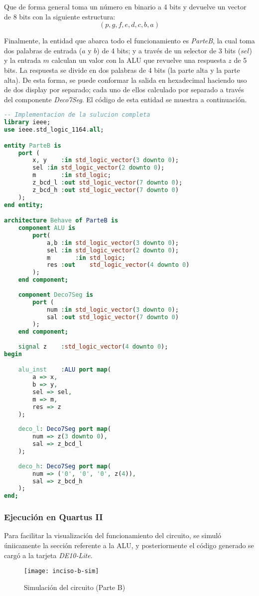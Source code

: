 \documentclass[../procedimientos.tex]{subfiles}
\begin{document}
Que de forma general toma un número en binario a 4 bits y devuelve un vector 
de 8 bits con la siguiente estructura:
\[(p, g, f, e, d, c, b, a)\]

Finalmente, la entidad que abarca todo el funcionamiento es \textit{ParteB}, 
la cual toma dos palabras de entrada ($a$ y $b$) de 4 bits; y a través de un 
selector de 3 bits ($sel$) y la entrada $m$ calculan un valor con la ALU que 
revuelve una respuesta $z$ de 5 bits. La respuesta se divide en dos palabras 
de 4 bits (la parte alta y la parte alta). De esta forma, se puede conformar 
la salida en hexadecimal haciendo uso de dos display por separado; cada uno de 
ellos calculado por separado a través del componente \textit{Deco7Seg}. El 
código de esta entidad se muestra a continuación.
\begin{lstlisting}[language=VHDL]
-- Implementacion de la sulucion completa
library ieee;
use ieee.std_logic_1164.all;

entity ParteB is
	port (
		x, y	:in std_logic_vector(3 downto 0);
		sel	:in std_logic_vector(2 downto 0);
		m		:in std_logic;
		z_bcd_l	:out std_logic_vector(7 downto 0);
		z_bcd_h	:out std_logic_vector(7 downto 0)
	);
end entity;

architecture Behave of ParteB is
	component ALU is
		port(
			a,b	:in	std_logic_vector(3 downto 0);
			sel	:in	std_logic_vector(2 downto 0);
			m		:in	std_logic;
			res	:out	std_logic_vector(4 downto 0)
		);
	end component;
	
	component Deco7Seg is
		port (
			num	:in std_logic_vector(3 downto 0);
			sal	:out std_logic_vector(7 downto 0)
		);
	end component;
	
	signal z	:std_logic_vector(4 downto 0);
begin

	alu_inst	:ALU port map(
		a => x,
		b => y,
		sel => sel,
		m => m,
		res => z
	);
	
	deco_l: Deco7Seg port map(
		num => z(3 downto 0),
		sal => z_bcd_l
	);
	
	deco_h: Deco7Seg port map(
		num => ('0', '0', '0', z(4)),
		sal => z_bcd_h
	);
end;
\end{lstlisting}

\subsubsection*{Ejecución en Quartus II}
Para facilitar la visualización del funcionamiento del circuito, se simuló 
úniicamente la sección referente a la ALU, y posteriormente el código generado 
se cargó a la tarjeta \textit{DE10-Lite}.
\begin{figure}[H]
  \centering
  \texttt{[image: inciso-b-sim]}
  \caption{Simulación del circuito (Parte B)}
  \label{fig:inciso_b_sim}
\end{figure}
\end{document}
